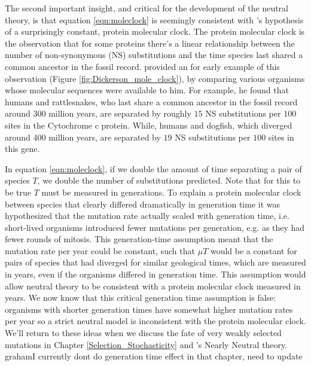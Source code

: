 The second important insight, and critical for the development of the neutral theory, is that equation \eqref{eqn:moleclock} is seemingly consistent with \citet{zuckerkandl1965evolutionary}'s hypothesis of a surprisingly constant, protein molecular clock. The protein molecular clock is the observation that for some proteins there's a linear relationship between the number of non-synonymous (NS) substitutions and the time species last shared a common ancestor in the fossil record. \citet{dickerson1971structure} provided an for early example of this observation (Figure \ref{fig:Dickerson_mole_clock}), by comparing various organisms whose molecular sequences were available to him. For example, he found that humans and rattlesnakes, who last share a common ancestor in the fossil record around 300 million years, are separated by roughly $15$ NS substitutions per $100$ sites in the Cytochrome c protein.
While, humans and dogfish, which diverged around 400 million years, are separated by $19$ NS substitutions per $100$ sites in this gene. \\ 

In equation \eqref{eqn:moleclock}, if we double the amount of time separating a pair of species $T$, we double the number of substitutions predicted. Note that for this to be true $T$ must be measured in generations. To explain a protein molecular clock between species that clearly differed dramatically in generation time it was hypothesized that the mutation rate actually scaled with generation time, i.e. short-lived organisms introduced fewer mutations per generation, e.g. as they had fewer rounds of mitosis. This generation-time assumption meant that the mutation rate per year could be constant, such that $\mu T$ would be a constant for pairs of species that had diverged for similar geological times, which are measured in years, even if the organisms differed in generation time. This assumption would allow neutral theory to be consistent with a protein molecular clock measured in years. We now know that this critical generation time assumption is false: organisms with shorter generation times have somewhat higher mutation rates per year so a strict neutral model is inconsistent with the protein molecular clock. We'll return to these ideas when we discuss the fate of very weakly selected mutations in Chapter \ref{Selection_Stochasticity} and \citet{ohta1973slightly}'s Nearly Neutral theory. %
 graham{I currently dont do generation time effect in that chapter, need to update}


